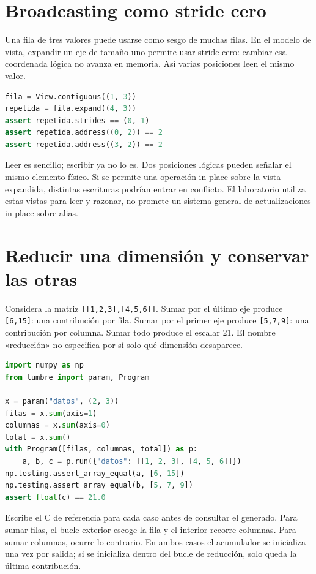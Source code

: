\documentclass[12pt,a4paper,oneside]{report}
\begin{document}
\section{Broadcasting como stride cero}
Una fila de tres valores puede usarse como sesgo de muchas filas. En el modelo de vista, expandir un eje de tamaño uno permite usar stride cero: cambiar esa coordenada lógica no avanza en memoria. Así varias posiciones leen el mismo valor.

\begin{lstlisting}[language=Python]
fila = View.contiguous((1, 3))
repetida = fila.expand((4, 3))
assert repetida.strides == (0, 1)
assert repetida.address((0, 2)) == 2
assert repetida.address((3, 2)) == 2
\end{lstlisting}
Leer es sencillo; escribir ya no lo es. Dos posiciones lógicas pueden señalar el mismo elemento físico. Si se permite una operación in-place sobre la vista expandida, distintas escrituras podrían entrar en conflicto. El laboratorio utiliza estas vistas para leer y razonar, no promete un sistema general de actualizaciones in-place sobre alias.

\section{Reducir una dimensión y conservar las otras}
Considera la matriz \texttt{[[1,2,3],[4,5,6]]}. Sumar por el último eje produce \texttt{[6,15]}: una contribución por fila. Sumar por el primer eje produce \texttt{[5,7,9]}: una contribución por columna. Sumar todo produce el escalar 21. El nombre «reducción» no especifica por sí solo qué dimensión desaparece.

\begin{lstlisting}[language=Python]
import numpy as np
from lumbre import param, Program

x = param("datos", (2, 3))
filas = x.sum(axis=1)
columnas = x.sum(axis=0)
total = x.sum()
with Program([filas, columnas, total]) as p:
    a, b, c = p.run({"datos": [[1, 2, 3], [4, 5, 6]]})
np.testing.assert_array_equal(a, [6, 15])
np.testing.assert_array_equal(b, [5, 7, 9])
assert float(c) == 21.0
\end{lstlisting}
Escribe el C de referencia para cada caso antes de consultar el generado. Para sumar filas, el bucle exterior escoge la fila y el interior recorre columnas. Para sumar columnas, ocurre lo contrario. En ambos casos el acumulador se inicializa una vez por salida; si se inicializa dentro del bucle de reducción, solo queda la última contribución.
\end{document}

